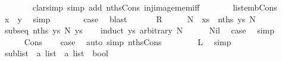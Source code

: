 \begin{isabellebody}
\ \ \ \ \ \ \isamarkupfalse%
\ {\isacharparenleft}clarsimp\ simp\ add{\isacharcolon}\ nths{\isacharunderscore}Cons\ inj{\isacharunderscore}image{\isacharunderscore}mem{\isacharunderscore}iff{\isacharparenright}\isanewline
\ \ \ \ \isamarkupfalse%
\ \isamarkupfalse%
\ list{\isacharunderscore}emb{\isacharunderscore}Cons{}\ \isamarkupfalse%
\ {\isachardoublequoteopen}x\ {\isacharequal}\ y{\isachardoublequoteclose}\ \isamarkupfalse%
\ simp\isanewline
\ \ \ \ \isamarkupfalse%
\ \isamarkupfalse%
\ {\isacharquery}case\ \isamarkupfalse%
\ blast\isanewline
\ \ \isamarkupfalse%
\isanewline
{}\isamarkupfalse%
\isanewline
\ \ \isamarkupfalse%
\ {\isacharquery}R\isanewline
\ \ \isamarkupfalse%
\ \isamarkupfalse%
\ N\ \ {\isachardoublequoteopen}xs\ {\isacharequal}\ nths\ ys\ N{\isachardoublequoteclose}\ \isacommand{{\isachardot}{\isachardot}}\isamarkupfalse%
\isanewline
\ \ \isamarkupfalse%
\ \isamarkupfalse%
\ {\isachardoublequoteopen}subseq\ {\isacharparenleft}nths\ ys\ N{\isacharparenright}\ ys{\isachardoublequoteclose}\isanewline
\ \ \isamarkupfalse%
\ {\isacharparenleft}induct\ ys\ arbitrary{\isacharcolon}\ N{\isacharparenright}\isanewline
\ \ \ \ \isamarkupfalse%
\ Nil\ \isamarkupfalse%
\ {\isacharquery}case\ \isamarkupfalse%
\ simp\isanewline
\ \ \isamarkupfalse%
\isanewline
\ \ \ \ \isamarkupfalse%
\ Cons\ \isamarkupfalse%
\ \isamarkupfalse%
\ {\isacharquery}case\ \isamarkupfalse%
\ {\isacharparenleft}auto\ simp{\isacharcolon}\ nths{\isacharunderscore}Cons{\isacharparenright}\isanewline
\ \ \isamarkupfalse%
\isanewline
\ \ \isamarkupfalse%
\ \isamarkupfalse%
\ {\isacharquery}L\ \isamarkupfalse%
\ simp\isanewline
{}\isamarkupfalse%
%
\endisatagproof
{\isafoldproof}%
%
\isadelimproof
%
\endisadelimproof
%
\isadelimdocument
%
\endisadelimdocument
%
\isatagdocument
%
\isamarkuptrue%
%
\endisatagdocument
{\isafolddocument}%
%
\isadelimdocument
%
\endisadelimdocument
{}\isamarkupfalse%
\ sublist\ {\isacharcolon}{\isacharcolon}\ {\isachardoublequoteopen}{\isacharprime}a\ list\ {\isasymRightarrow}\ {\isacharprime}a\ list\ {\isasymRightarrow}\ bool{\isachardoublequoteclose}\ \ \isanewline

\end{isabellebody}
